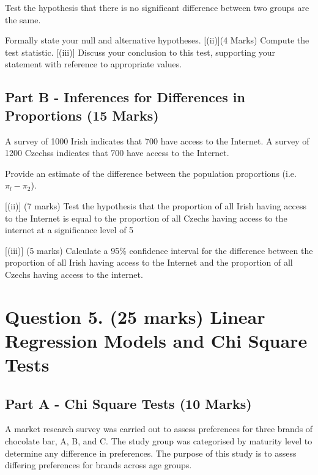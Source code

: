 \noindent Test the hypothesis that there is no significant difference between two groups are the same.

\begin{itemize}
[(i)] Formally state your null and alternative hypotheses.
[(ii)](4 Marks) Compute the test statistic.
[(iii)] Discuss your conclusion to this test, supporting your statement with reference to appropriate values.
\end{itemize}


\subsection*{Part B - Inferences for Differences in Proportions (15 Marks)}
A survey of 1000 Irish indicates that 700 have access to the Internet. A survey of 1200 Czechss
indicates that 700 have access to the Internet.
\begin{itemize}
[(i)]  Provide an estimate of the difference between the population
	proportions (i.e. $\pi_l -\pi_2$).
	
[(ii)] (7 marks) Test the hypothesis that the proportion of all Irish
	having access to the Internet is equal to the proportion of all Czechs having access to the
	internet at a significance level of 5%
	
[(iii)] (5 marks) Calculate a 95\% confidence interval for the difference between the proportion of all Irish
	having access to the Internet and the proportion of all Czechs having access to the
	internet.
	
	
\end{itemize}

\newpage

\section*{Question 5. (25 marks) Linear Regression Models and Chi Square Tests }
\subsection*{Part A - Chi Square Tests (10 Marks)}
A market research survey was carried out to assess preferences for three brands of chocolate bar, A, B, and C. 
The study group was categorised by maturity level to determine any difference in preferences. The purpose of this study is to assess differing preferences for brands across age groups.


